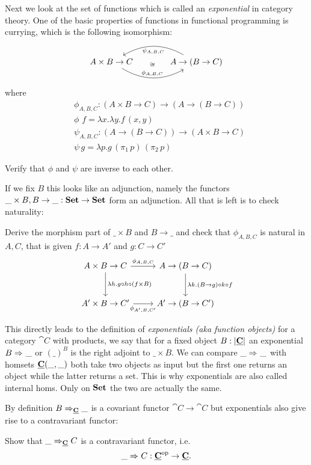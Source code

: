 Next we look at the set of functions which is called an \emph{exponential} in category theory. One of the basic properties of functions in functional programming is currying, which is the following isomorphism:
\[\begin{tikzcd}[column sep = large]
A\times B \to C \arrow[r,"\phi_{A,B,C}",bend right,"\cong" above=11] & A\to(B \to C) \arrow[l,"\psi_{A,B,C}",bend right]
\end{tikzcd}\]
where
\begin{align*}
  &\phi_{A,B,C} : (A\times B \to C) \to (A\to(B \to C))\\
  &\phi\,\,f = \lambda x.\lambda y.f\,(x,y)\\
  &\psi_{A,B,C} : (A\to(B \to C)) \to (A\times B \to C) \\
  &\psi\,g = \lambda p.g\,(\pi_1\,p)\,(\pi_2\,p)
\end{align*}
\begin{Exercise}
  Verify that $\phi$ and $\psi$ are inverse to each other.
\end{Exercise}
If we fix $B$ this looks like an adjunction, namely the functors $\_\times B, B \to \_ : \Set \to \Set$ form an adjunction. All that is left is to check naturality:
\begin{Exercise}
  Derive the morphism part of $\_\times B$ and $B \to \_$ and
  check that $\phi_{A,B,C}$ is natural in $A,C$, that is given $f : A \to A'$ and $g : C \to C'$
\[\begin{tikzcd}[row sep = large]
   A\times B \to C \arrow[r,"\phi_{A,B,C}"] \arrow[d,"\lambda h. g\circ h \circ (f \times B)"] & A\to(B \to C) \arrow[d,"\lambda k. (B \to g)\circ k \circ f"] \\
   A'\times B \to C'  \arrow[r,"\phi_{A',B,C'}" below]  & A'\to(B \to C') 
\end{tikzcd}\]  
\end{Exercise}

This directly leads to the definition of \emph{exponentials (aka function objects)} for a category $\cat{C}$ with products, we say that for a fixed object $B:\obj{\cat{C}}$ an exponential $\expC{}{B}{\_}$ or $(\_)^B$ is the right adjoint to $\_ \times B$. We can compare $\expC{}{\_}{\_}$ with homsets $\homC{C}{\_}{\_}$ both take two objects as input but the first one returns an object while the latter returns a set. This is why exponentials are also called internal homs. Only on $\Set$ the two are actually the same.

By definition $\expC{\cat{C}}{B}{\_}$ is a covariant functor $\cat{C} \to \cat{C}$ but exponentials also give rise to a contravariant functor:
\begin{Exercise}
Show that $\expC{\cat{C}}{\_}{C}$ is a contravariant functor, i.e. 
\[\expC{}{\_}{C} : \cat{C}^\op \to \cat{C}.\]     
\end{Exercise}

